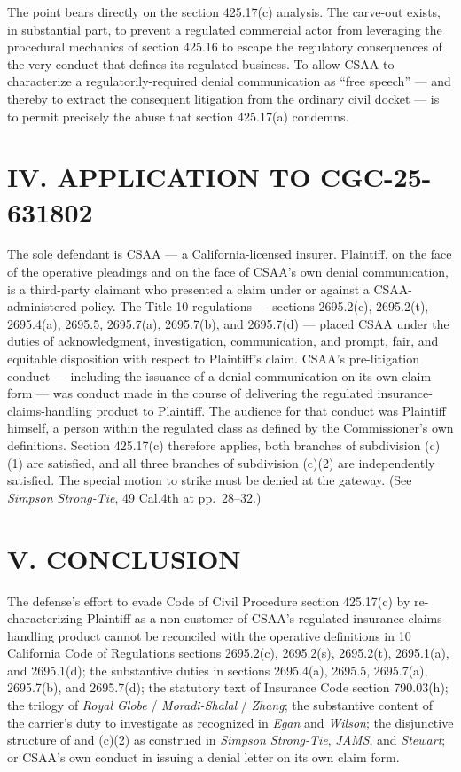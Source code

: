 The point bears directly on the section 425.17(c) analysis. The carve-out exists, in substantial part, to prevent a regulated commercial actor from leveraging the procedural mechanics of section 425.16 to escape the regulatory consequences of the very conduct that defines its regulated business. To allow CSAA to characterize a regulatorily-required denial communication as ``free speech'' --- and thereby to extract the consequent litigation from the ordinary civil docket --- is to permit precisely the abuse that section 425.17(a) condemns.

\section*{IV. APPLICATION TO CGC-25-631802}

The sole defendant is CSAA --- a California-licensed insurer. Plaintiff, on the face of the operative pleadings and on the face of CSAA's own denial communication, is a third-party claimant who presented a claim under or against a CSAA-administered policy. The Title 10 regulations --- sections 2695.2(c), 2695.2(t), 2695.4(a), 2695.5, 2695.7(a), 2695.7(b), and 2695.7(d) --- placed CSAA under the duties of acknowledgment, investigation, communication, and prompt, fair, and equitable disposition with respect to Plaintiff's claim. CSAA's pre-litigation conduct --- including the issuance of a denial communication on its own claim form --- was conduct made in the course of delivering the regulated insurance-claims-handling product to Plaintiff. The audience for that conduct was Plaintiff himself, a person within the regulated class as defined by the Commissioner's own definitions. Section 425.17(c) therefore applies, both branches of subdivision (c)(1) are satisfied, and all three branches of subdivision (c)(2) are independently satisfied. The special motion to strike must be denied at the gateway. (See \textit{Simpson Strong-Tie}, 49 Cal.4th at pp.\ 28--32.)

\section*{V. CONCLUSION}

The defense's effort to evade Code of Civil Procedure section 425.17(c) by re-characterizing Plaintiff as a non-customer of CSAA's regulated insurance-claims-handling product cannot be reconciled with the operative definitions in 10 California Code of Regulations sections 2695.2(c), 2695.2(s), 2695.2(t), 2695.1(a), and 2695.1(d); the substantive duties in sections 2695.4(a), 2695.5, 2695.7(a), 2695.7(b), and 2695.7(d); the statutory text of Insurance Code section 790.03(h); the trilogy of \textit{Royal Globe} / \textit{Moradi-Shalal} / \textit{Zhang}; the substantive content of the carrier's duty to investigate as recognized in \textit{Egan} and \textit{Wilson}; the disjunctive structure of  and (c)(2) as construed in \textit{Simpson Strong-Tie}, \textit{JAMS}, and \textit{Stewart}; or CSAA's own conduct in issuing a denial letter on its own claim form.

